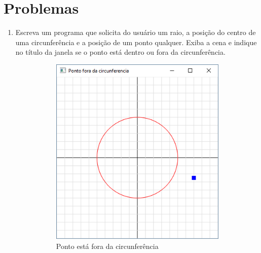 \section*{Problemas}
\begin{enumerate}

\item
   Escreva um programa que solicita do usuário um raio, a posição do centro de uma circunferência e a posição de um ponto qualquer. Exiba a cena e indique no título da janela se o ponto está dentro ou fora da circunferência.

   \begin{figure}[!htb]
    \centering
    \begin{subfigure}[b]{0.4\textwidth}
        \centerline{\includegraphics[width=.9\textwidth]{img/cap1_ex22}}
        \caption{Ponto está fora da circunferência}
        \label{fig:cap01_ex22a}
    \end{subfigure}
    ~
    \begin{subfigure}[b]{0.4\textwidth}

\end{subfigure}
\end{figure}
\end{enumerate}
